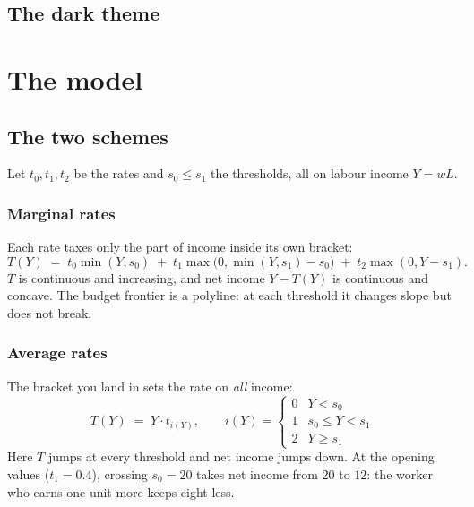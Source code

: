\documentclass[11pt,a4paper]{appletmanual}
\begin{document}

\subsection{The dark theme}


\section{The model}

\subsection{The two schemes}

Let $t_0, t_1, t_2$ be the rates and $s_0 \le s_1$ the thresholds, all on
labour income $Y = wL$.

\subsubsection{Marginal rates}

Each rate taxes only the part of income inside its own bracket:
\[
  T(Y) \;=\; t_0\min(Y, s_0)
        \;+\; t_1\max\bigl(0, \min(Y, s_1) - s_0\bigr)
        \;+\; t_2\max(0, Y - s_1).
\]
$T$ is continuous and increasing, and net income $Y - T(Y)$ is continuous and
concave. The budget frontier is a polyline: at each threshold it changes slope
but does not break.

\subsubsection{Average rates}

The bracket you land in sets the rate on \emph{all} income:
\[
  T(Y) \;=\; Y \cdot t_{i(Y)},
  \qquad
  i(Y) = \begin{cases} 0 & Y < s_0\\ 1 & s_0 \le Y < s_1\\ 2 & Y \ge s_1\end{cases}
\]
Here $T$ jumps at every threshold and net income jumps down. At the opening
values ($t_1 = 0.4$), crossing $s_0 = 20$ takes net income from $20$ to $12$:
the worker who earns one unit more keeps eight less.
\end{document}
